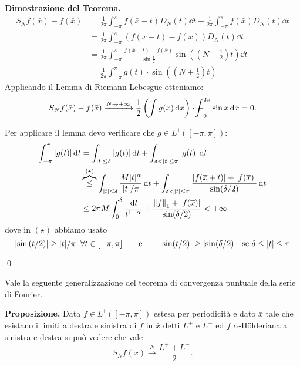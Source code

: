 \textbf{Dimostrazione del Teorema.}
\begin{align*}
	S_N f(\bar x) - f(\bar x) 
	&= \frac{1}{2\pi} \int_{-\pi}^\pi f(\bar x - t) D_N(t) \dd t - \frac{1}{2\pi} \int_{-\pi}^\pi f(\bar x) D_N(t) \dd t \\
	&= \frac{1}{2\pi} \int_{-\pi}^\pi (f(\bar x - t) - f(\bar x)) D_N(t) \dd t \\
	&= \frac{1}{2\pi} \int_{-\pi}^\pi \frac{f(\bar x - t) - f(\bar x)}{\sin \frac{t}{2}} \sin \left(\left(N + \frac{1}{2}\right) t\right) \dd t \\
	&= \frac{1}{2\pi} \int_{-\pi}^\pi g(t) \cdot \sin \left(\left(N + \frac{1}{2}\right) t\right)
\end{align*}
Applicando il Lemma di Riemann-Lebesgue otteniamo:
%
$$
	S_N f(\bar{x}) - f(\bar{x}) \xrightarrow{N \to +\infty} \frac{1}{2} \left(\int g(x) \dd x\right) \cdot \avint_0^{2\pi} \sin x \dd x = 0.
$$
%

Per applicare il lemma devo verificare che $g \in L^1([-\pi,\pi])$:
\begin{align*}
	\int_{-\pi}^\pi |g(t)| \,\mathrm{d} t
	& = \int_{|t| \leq \delta} |g(t)| \,\mathrm{d} t + \int_{\delta < |t| \leq \pi} |g(t)| \,\mathrm{d} t \\
	& \overbrace{\leq}^{(\star)} \int_{|t| \leq \delta} \frac{M |t|^\alpha}{|t|/\pi} \,\mathrm{d} t
	+ \int_{\delta < |t| \leq \pi} \frac{|f(\overline{x} + t)| + |f(\overline{x})|}{\sin(\delta / 2)} \,\mathrm{d} t \\
	& \leq 2\pi M \int_0^\delta \frac{\,\mathrm{d} t}{t^{1-\alpha}} + \frac{\left\lVert f \right\rVert_1 + |f(\overline{x})|}{\sin(\delta/2)} < +\infty
\end{align*}
dove in $(\star)$ abbiamo usato
$$
	\left| \sin\left( t/2 \right) \right| \geq |t|/\pi \;\; \forall t \in [-\pi,\pi]
	\qquad \text{e} \qquad  
	\left| \sin(t/2) \right| \geq \left| \sin(\delta / 2) \right| \;\; \text{se } \delta \leq |t| \leq \pi
$$


\qed

Vale la seguente generalizzazione del teorema di convergenza puntuale della serie di Fourier.

\textbf{Proposizione.} Data $f \in L^1([-\pi, \pi])$ estesa per periodicità e dato $\bar x$ tale che esistano i limiti a destra e sinistra di $f$ in $\bar x$ detti $L^+$ e $L^-$ ed $f$ $\alpha$-H\"olderiana a sinistra e destra si può vedere che vale
$$
	S_N f(\bar x) \xrightarrow{N} \frac{L^+ + L^-}{2}.
$$
